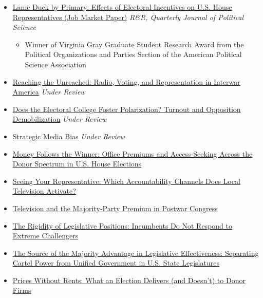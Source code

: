 \documentclass[11pt, Letter]{article}
\begin{document}
\begin{itemize}[leftmargin=47pt,itemindent=-21pt]
\item[] \href{https://osf.io/preprints/socarxiv/ygcqv_v1}{Lame Duck by Primary: Effects of Electoral Incentives on U.S. House Representatives (Job Market Paper)} \textit{R\&R, Quarterly Journal of Political Science}
\begin{itemize}
    \item[] \small{Winner of Virginia Gray Graduate Student Research Award from the Political Organizations and Parties Section of the American Political Science Association}
\end{itemize}
\item[] \href{https://kisookim.github.io/assets/papers/reaching-the-unreached.pdf}{Reaching the Unreached: Radio, Voting, and Representation in Interwar America} \textit{Under Review}
\item[] \href{https://kisookim.github.io/assets/papers/electoral-college-polarization.pdf}{Does the Electoral College Foster Polarization? Turnout and Opposition Demobilization} \textit{Under Review}
\item[] \href{https://kisookim.github.io/assets/papers/strategic-media-bias.pdf}{Strategic Media Bias} \textit{Under Review}
\item[] \href{https://kisookim.github.io/assets/papers/money-follows-the-winner.pdf}{Money Follows the Winner: Office Premiums and Access-Seeking Across the Donor Spectrum in U.S. House Elections}
\item[] \href{https://kisookim.github.io/assets/papers/seeing-your-representative.pdf}{Seeing Your Representative: Which Accountability Channels Does Local Television Activate?}
\item[] \href{https://kisookim.github.io/assets/papers/television-majority-party-premium.pdf}{Television and the Majority-Party Premium in Postwar Congress}
\item[] \href{https://kisookim.github.io/assets/papers/rigidity-of-legislative-positions.pdf}{The Rigidity of Legislative Positions: Incumbents Do Not Respond to Extreme Challengers}
\item[] \href{https://kisookim.github.io/assets/papers/source-of-the-majority-advantage.pdf}{The Source of the Majority Advantage in Legislative Effectiveness: Separating Cartel Power from Unified Government in U.S. State Legislatures}
\item[] \href{https://kisookim.github.io/assets/papers/prices-without-rents.pdf}{Prices Without Rents: What an Election Delivers (and Doesn't) to Donor Firms}
\end{itemize}
\end{document}
